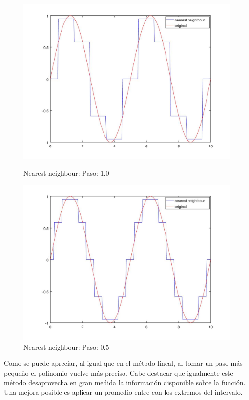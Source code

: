 \begin{figure}[h]
  \begin{minipage}[b]{.5\textwidth}
    \includegraphics[width=\textwidth]{complementos/nearest_1.jpg}
    \caption{Nearest neighbour: Paso: 1.0}
  \end{minipage}
  \begin{minipage}[b]{.5\textwidth}
    \includegraphics[width=\textwidth]{complementos/nearest_05.jpg}
    \caption{Nearest neighbour: Paso: 0.5}
  \end{minipage}
\end{figure}

Como se puede apreciar, al igual que en el método lineal, al tomar un paso más pequeño el polinomio vuelve más preciso. Cabe destacar que igualmente este método desaprovecha en gran medida la información disponible sobre la función. Una mejora posible es aplicar un promedio entre con los extremos del intervalo.

